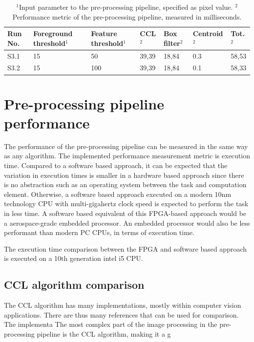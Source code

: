 \documentclass[12pt]{report}
\begin{document}
\begin{table}[!h]
    \centering
    \begin{tabular}{|p{0.8cm}|p{2.5cm}|p{2cm}||p{1.25cm}|p{1.25cm}|p{1.8cm}|p{1cm}|}
        \hline
        \textbf{Run No.}&\textbf{Foreground threshold$^{1}$}&\textbf{Feature threshold$^{1}$}&\textbf{CCL$^{2}$}&\textbf{Box filter$^{2}$}&\textbf{Centroid$^{2}$}&\textbf{Tot.$^{2}$}\\
        \hline
        \hline
        S3.1&15&50&39,39&18,84&0.3&58,53\\
        \hline
        S3.2&15&100&39,39&18,84&0.1&58,33\\
        \hline
    \end{tabular}
    \caption{$^{1}$Input parameter to the pre-processing pipeline, specified as pixel value. $^{2}$Performance metric of the pre-processing pipeline, measured in milliseconds. }
    \label{table:s2_res}
\end{table}

\section{Pre-processing pipeline performance}
The performance of the pre-processing pipeline can be measured in the same way as any algorithm. The implemented performance measurement metric is execution time. Compared to a software based approach, it can be expected that the variation in execution times is smaller in a hardware based approach since there is no abstraction such as an operating system between the task and computation element. Otherwise, a software based approach executed on a modern 10nm technology CPU with multi-gigahertz clock speed is expected to perform the task in less time. A software based equivalent of this FPGA-based approach would be a aerospace-grade embedded processor. An embedded processor would also be less performant than modern PC CPUs, in terms of execution time.
\par
The execution time comparison between the FPGA and software based approach is executed on a 10th generation intel i5 CPU. 

\subsection{CCL algorithm comparison}
The CCL algorithm has many implementations, mostly within computer vision applications. There are thus many references that can be used for comparison.
The implementa
The most complex part of the image processing in the pre-processing pipeline is the CCL algorithm, making it a g
\end{document}
